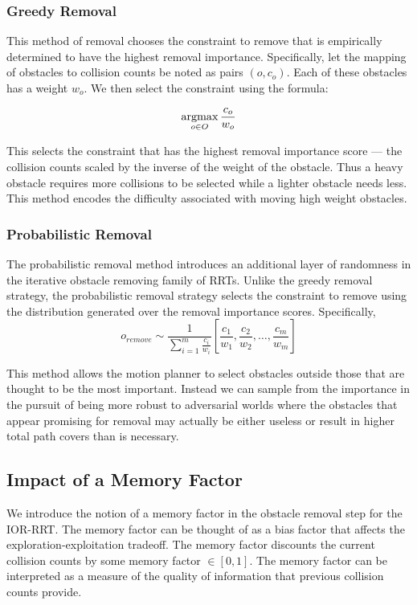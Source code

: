 \subsubsection{Greedy Removal}
This method of removal chooses the constraint to remove that is empirically determined to have the highest removal importance. Specifically, let the mapping of obstacles to collision counts be noted as pairs $(o, c_o)$. Each of these obstacles has a weight $w_o$. We then select the constraint using the formula:

$$\operatorname*{argmax}\limits_{o \in O} \frac{c_o}{w_o}$$

This selects the constraint that has the highest removal importance score --- the collision counts scaled by the inverse of the weight of the obstacle. Thus a heavy obstacle requires more collisions to be selected while a lighter obstacle needs less. This method encodes the difficulty associated with moving high weight obstacles.

\subsubsection{Probabilistic Removal}
The probabilistic removal method introduces an additional layer of randomness in the iterative obstacle removing family of RRTs. Unlike the greedy removal strategy, the probabilistic removal strategy selects the constraint to remove using the distribution generated over the removal importance scores. Specifically,
$$o_{remove} \sim \frac{1}{\sum_{i=1}^m \frac{c_i}{w_i}}[\frac{c_1}{w_1}, \frac{c_2}{w_2},\ldots, \frac{c_m}{w_m}]$$

This method allows the motion planner to select obstacles outside those that are thought to be the most important. Instead we can sample from the importance in the pursuit of being more robust to adversarial worlds where the obstacles that appear promising for removal may actually be either useless or result in higher total path covers than is necessary. 


\subsection{Impact of a Memory Factor}
We introduce the notion of a memory factor in the obstacle removal step for the IOR-RRT. The memory factor can be thought of as a bias factor that affects the exploration-exploitation tradeoff. The memory factor discounts the current collision counts by some memory factor $\in [0,1]$. The memory factor can be interpreted as a measure of the quality of information that previous collision counts provide.

